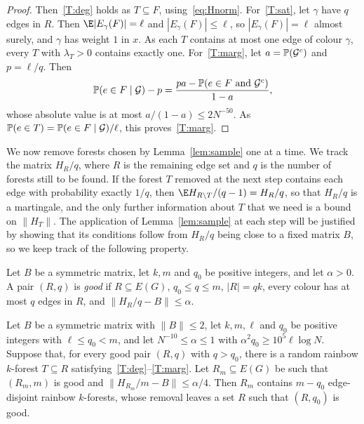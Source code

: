 \begin{proof}
Then~\ref{T:deg} holds as $T\subseteq F$, using~\eqref{eq:Hnorm}.
For~\ref{T:sat}, let $\gamma$ have $q$ edges in $R$. Then $\E|E_\gamma(F)|=\ell$ and $|E_\gamma(F)|\le\ell$, so $|E_\gamma(F)|=\ell$ almost surely, and $\gamma$ has weight $1$ in $x$. As each $T$ contains at most one edge of colour $\gamma$, every $T$ with $\lambda_T>0$ contains exactly one.
For~\ref{T:marg}, let $a=\mathbb{P}(\mathcal G^c)$ and $p=\ell/q$. Then
\[
\mathbb{P}(e\in F\mid\mathcal G)-p=\frac{pa-\mathbb{P}(e\in F\text{ and }\mathcal G^c)}{1-a},
\]
whose absolute value is at most $a/(1-a)\le2N^{-50}$. As $\mathbb{P}(e\in T)=\mathbb{P}(e\in F\mid\mathcal G)/\ell$, this proves~\ref{T:marg}.
\end{proof}

We now remove forests chosen by Lemma~\ref{lem:sample} one at a time.
We track the matrix $H_R/q$, where $R$ is the remaining edge set and $q$ is the number of forests still to be found.
If the forest $T$ removed at the next step contains each edge with probability exactly $1/q$, then $\E H_{R\setminus T}/(q-1)=H_R/q$, so that $H_R/q$ is a martingale, and the only further information about $T$ that we need is a bound on $\|H_T\|$.
The application of Lemma~\ref{lem:sample} at each step will be justified by showing that its conditions follow from $H_R/q$ being close to a fixed matrix $B$, so we keep track of the following property.

\begin{definition}\label{def:good}
Let $B$ be a symmetric matrix, let $k,m$ and $q_0$ be positive integers, and let $\alpha>0$. A pair $(R,q)$ is \emph{good} if $R\subseteq E(G)$, $q_0\le q\le m$, $|R|=qk$, every colour has at most $q$ edges in $R$, and $\|H_R/q-B\|\le\alpha$.
\end{definition}

\begin{lemma}\label{lem:extract}
Let $B$ be a symmetric matrix with $\|B\|\le2$, let $k,m,\ell$ and $q_0$ be positive integers with $\ell\le q_0<m$, and let $N^{-10}\le\alpha\le1$ with $\alpha^2q_0\ge10^5\ell\log N$.
Suppose that, for every good pair $(R,q)$ with $q>q_0$, there is a random rainbow $k$-forest $T\subseteq R$ satisfying~\ref{T:deg}--\ref{T:marg}.
Let $R_m\subseteq E(G)$ be such that $(R_m,m)$ is good and $\|H_{R_m}/m-B\|\le\alpha/4$.
Then $R_m$ contains $m-q_0$ edge-disjoint rainbow $k$-forests, whose removal leaves a set $R$ such that $(R,q_0)$ is good.
\end{lemma}

